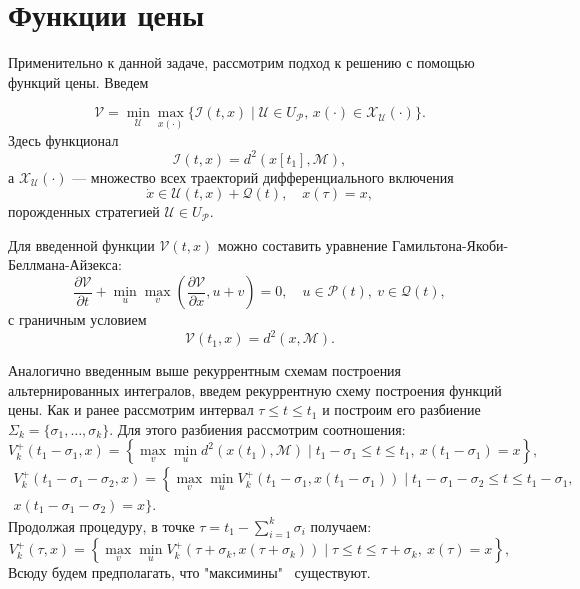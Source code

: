 \section{Функции цены}
Применительно к данной задаче, рассмотрим подход к решению с помощью функций цены. Введем

\begin{equation*}
    \mathcal{V} = \min_{\mathcal{U}} \max_{x(\cdot)} \{\mathcal{I}(t,x) \mid \mathcal{U} \in 
     U_{\mathcal{P}}, \, x(\cdot) \in \mathcal{X}_{\mathcal{U}}(\cdot) \}.
\end{equation*}
Здесь функционал
\begin{equation*}
     \mathcal{I}(t,x) = d^2(x[t_1], \mathcal{M}),
\end{equation*}
а \( \mathcal{X}_{\mathcal{U}}(\cdot) \) --- множество всех траекторий дифференциального включения
\begin{equation*}
    \dot{x} \in \mathcal{U}(t,x) + \mathcal{Q}(t), \quad x(\tau) = x,
\end{equation*}
порожденных стратегией \( \mathcal{U} \in U_{\mathcal{P}} \).

Для введенной функции \( \mathcal{V}(t,x) \) можно составить уравнение Гамильтона-Якоби-Беллмана-Айзекса:
\begin{equation}\label{HJBI}
    \frac{\partial \mathcal{V}}{\partial t} + \min_u \max_v \left( \frac{\partial \mathcal{V}}
     {\partial x}, u + v \right) = 0, \quad u \in \mathcal{P}(t), \ v \in \mathcal{Q}(t),
\end{equation}
с граничным условием
\begin{equation}\label{HJBI_boundary}
    \mathcal{V}(t_1, x) = d^2(x, \mathcal{M}).
\end{equation}

Аналогично введенным выше рекуррентным схемам построения альтернированных интегралов, 
введем рекуррентную схему построения функций цены. Как и ранее рассмотрим интервал 
 \( \tau \le t \le t_1 \) и построим его разбиение \( \Sigma_k = \{ \sigma_1, \dots, \sigma_k \} \).
 Для этого разбиения рассмотрим соотношения:
\begin{equation*}
    V_k^+(t_1 - \sigma_1, x) = \left\{ \max_v \min_u d^2(x(t_1), \mathcal{M}) \mid t_1 -
     \sigma_1 \le t \le t_1, \ x(t_1 - \sigma_1) = x \right\},
\end{equation*}
\begin{multline*} 
    V_k^+(t_1 - \sigma_1 - \sigma_2, x) = \left\{ \max_v \min_u V_k^+(t_1 - \sigma_1, x(t_1 -
     \sigma_1)) \mid t_1 - \sigma_1 - \sigma_2 \le t \le t_1 - \sigma_1, \right. \\ 
    x(t_1 - \sigma_1 - \sigma_2) = x \Big\}.
\end{multline*}
Продолжая процедуру, в точке \( \tau = t_1 - \sum\limits_{i = 1}^k \sigma_i \) получаем:
\begin{equation*}
    V_k^+(\tau, x) = \left\{ \max_v \min_u V_k^+ (\tau + \sigma_k, x(\tau + \sigma_k)) \mid
     \tau \le t \le \tau + \sigma_k, \ x(\tau) = x \right\},
\end{equation*}
Всюду будем предполагать, что "максимины" \ существуют.

